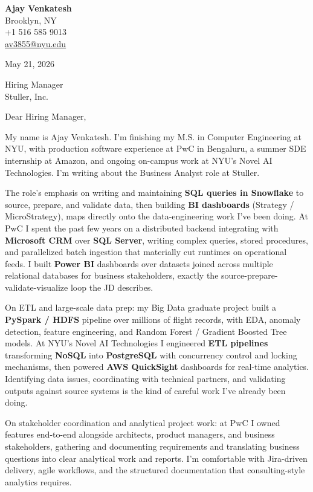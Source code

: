 \documentclass[letterpaper,11pt]{article}
\begin{document}
\begin{flushleft}
\textbf{\large Ajay Venkatesh} \\
Brooklyn, NY \\
+1 516 585 9013 \\
\href{mailto:av3855@nyu.edu}{av3855@nyu.edu}
\end{flushleft}
\vspace{10pt}
May 21, 2026
\vspace{6pt}

Hiring Manager \\
Stuller, Inc.

\vspace{10pt}

Dear Hiring Manager,

My name is Ajay Venkatesh. I'm finishing my M.S. in Computer Engineering at NYU, with production software experience at PwC in Bengaluru, a summer SDE internship at Amazon, and ongoing on-campus work at NYU's Novel AI Technologies. I'm writing about the Business Analyst role at Stuller.

The role's emphasis on writing and maintaining \textbf{SQL queries in Snowflake} to source, prepare, and validate data, then building \textbf{BI dashboards} (Strategy / MicroStrategy), maps directly onto the data-engineering work I've been doing. At PwC I spent the past few years on a distributed backend integrating with \textbf{Microsoft CRM} over \textbf{SQL Server}, writing complex queries, stored procedures, and parallelized batch ingestion that materially cut runtimes on operational feeds. I built \textbf{Power BI} dashboards over datasets joined across multiple relational databases for business stakeholders, exactly the source-prepare-validate-visualize loop the JD describes.

On ETL and large-scale data prep: my Big Data graduate project built a \textbf{PySpark / HDFS} pipeline over millions of flight records, with EDA, anomaly detection, feature engineering, and Random Forest / Gradient Boosted Tree models. At NYU's Novel AI Technologies I engineered \textbf{ETL pipelines} transforming \textbf{NoSQL} into \textbf{PostgreSQL} with concurrency control and locking mechanisms, then powered \textbf{AWS QuickSight} dashboards for real-time analytics. Identifying data issues, coordinating with technical partners, and validating outputs against source systems is the kind of careful work I've already been doing.

On stakeholder coordination and analytical project work: at PwC I owned features end-to-end alongside architects, product managers, and business stakeholders, gathering and documenting requirements and translating business questions into clear analytical work and reports. I'm comfortable with Jira-driven delivery, agile workflows, and the structured documentation that consulting-style analytics requires.
\end{document}
